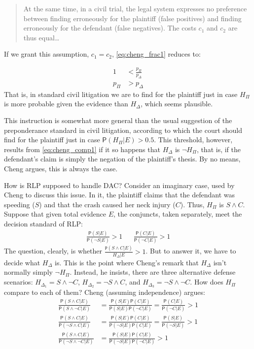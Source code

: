 \documentclass[10pt,dvipsnames,enabledeprecatedfontcommands]{scrartcl}
\newcommand{\n}{\neg}
\newcommand{\et}{\wedge}
\newcommand{\pr}[1]{\mathsf{P}(#1)}
\begin{document}
\begin{quote}
At the same time, in a civil trial, the legal system expresses no preference between finding erroneously for the plaintiff (false positives) and finding erroneously for the defendant (false negatives). The costs $c_1$ and $c_2$ are thus equal\dots
\end{quote}

\noindent If we grant this assumption, \(c_1=c_2\),
\eqref{eq:cheng_frac1} reduces to:

\vspace{-6mm}

\begin{align}
\nonumber 1 &< \frac{p_\Pi}{p_\Delta} \\
\label{eq:cheng_comp1} p_\Pi &> p_\Delta 
\end{align} \noindent That is, in standard civil litigation we are to
find for the plaintiff just in case \(H_\Pi\) is more probable given the
evidence than \(H_\Delta\), which seems plausible.

This instruction is somewhat more general than the usual suggestion of
the preponderance standard in civil litigation, according to which the
court should find for the plaintiff just in case
\(\pr{H_\Pi\vert E} >0.5\). This threshold, however, results from
\eqref{eq:cheng_comp1} if it so happens that \(H_\Delta\) is
\(\n H_\Pi\), that is, if the defendant's claim is simply the negation
of the plaintiff's thesis. By no means, Cheng argues, this is always the
case.

How is RLP supposed to handle DAC? Consider an imaginary case, used by
Cheng to discuss this issue. In it, the plaintiff claims that the
defendant was speeding (\(S\)) and that the crash caused her neck injury
(\(C\)). Thus, \(H_\Pi\) is \(S\et C\). Suppose that given total
evidence \(E\), the conjuncts, taken separately, meet the decision
standard of RLP: \begin{align}
 \nonumber 
 \frac{\pr{S\vert E}}{\pr{\n S \vert E}} > 1   & & \frac{\pr{C\vert E}}{\pr{\n C \vert E}} > 1
\end{align} \noindent The question, clearly, is whether
\(\frac{\mathtt{P}(S\et C\vert E)}{H_\Delta \vert E}>1\). But to answer
it, we have to decide what \(H_\Delta\) is. This is the point where
Cheng's remark that \(H_\Delta\) isn't normally simply \(\n H_\Pi\).
Instead, he insists, there are three alternative defense scenarios:
\(H_{\Delta_1}= S\et \n C\), \(H_{\Delta_2}=\n S \et C\), and
\(H_{\Delta_3}=\n S \et \n C\). How does \(H_\Pi\) compare to each of
them? Cheng (assuming independence) argues:
\begin{align}\label{eq:cheng-multiplication}
\frac{\pr{S\et C\vert E}}{\pr{S\et \n C\vert E}} & = \frac{\pr{S\vert E}\pr{C\vert E}}{\pr{S \vert E}\pr{\n C \vert E}}  =\frac{\pr{C\vert E}}{\pr{\n C \vert E}} > 1 \\
\nonumber
\frac{\pr{S\et C\vert E}}{\pr{\n S\et C\vert E}} & = \frac{\pr{S\vert E}\pr{C\vert E}}{\pr{\n S \vert E}\pr{C\vert E}}  = \frac{\pr{S\vert E}}{\pr{\n S \vert E}} > 1 \\
\nonumber
\frac{\pr{S\et C\vert E}}{\pr{\n S\et \n C\vert E}} & = \frac{\pr{S\vert E}\pr{C\vert E}}{\pr{\n S \vert E}\pr{\n C \vert E}}   > 1 
\end{align}
\end{document}
